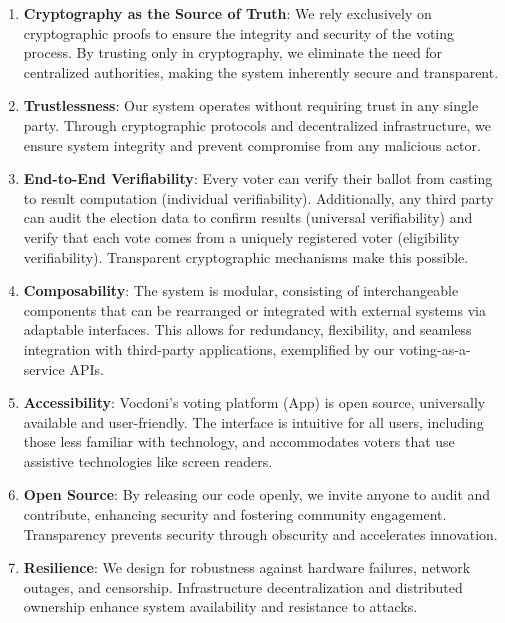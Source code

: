 \begin{enumerate}
	\item \textbf{Cryptography as the Source of Truth}: We rely exclusively on cryptographic proofs to ensure the integrity and security of the voting process. By trusting only in cryptography, we eliminate the need for centralized authorities, making the system inherently secure and transparent.
	
	\item \textbf{Trustlessness}: Our system operates without requiring trust in any single party. Through cryptographic protocols and decentralized infrastructure, we ensure system integrity and prevent compromise from any malicious actor.
	
	\item \textbf{End-to-End Verifiability}: Every voter can verify their ballot from casting to result computation (individual verifiability). Additionally, any third party can audit the election data to confirm results (universal verifiability) and verify that each vote comes from a uniquely registered voter (eligibility verifiability). Transparent cryptographic mechanisms make this possible.
	
	\item \textbf{Composability}: The system is modular, consisting of interchangeable components that can be rearranged or integrated with external systems via adaptable interfaces. This allows for redundancy, flexibility, and seamless integration with third-party applications, exemplified by our voting-as-a-service APIs.
	
	\item \textbf{Accessibility}: Vocdoni’s voting platform (App) is open source, universally available and user-friendly. The interface is intuitive for all users, including those less familiar with technology, and accommodates voters that use assistive technologies like screen readers.
	
	\item \textbf{Open Source}: By releasing our code openly, we invite anyone to audit and contribute, enhancing security and fostering community engagement. Transparency prevents security through obscurity and accelerates innovation.
	
	\item \textbf{Resilience}: We design for robustness against hardware failures, network outages, and censorship. Infrastructure decentralization and distributed ownership enhance system availability and resistance to attacks.
	

\end{enumerate}
